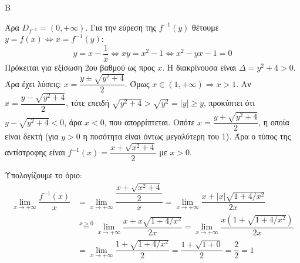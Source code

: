 \begin{thema}{Β}
\begin{erwthma}
Άρα $D_{f^{-1}} = (0, +\infty)$. Για την εύρεση της $f^{-1}(y)$ θέτουμε $y=f(x)\Leftrightarrow x=f^{-1}(y)$:
\[ y = x - \dfrac{1}{x} \Leftrightarrow xy = x^2 - 1 \Leftrightarrow x^2 - yx - 1 = 0 \]
Πρόκειται για εξίσωση 2ου βαθμού ως προς $x$. Η διακρίνουσα είναι $\Delta = y^2 + 4 > 0$. Άρα έχει λύσεις:
$x = \dfrac{y \pm \sqrt{y^2+4}}{2}$.
Όμως $x \in (1, +\infty) \Rightarrow x > 1$.
Αν $x = \dfrac{y - \sqrt{y^2+4}}{2}$, τότε επειδή $\sqrt{y^2+4} > \sqrt{y^2} = |y| \ge y$, προκύπτει ότι $y - \sqrt{y^2+4} < 0$, άρα $x < 0$, που απορρίπτεται.
Οπότε $x = \dfrac{y + \sqrt{y^2+4}}{2}$, η οποία είναι δεκτή (για $y>0$ η ποσότητα είναι όντως μεγαλύτερη του 1).
Άρα ο τύπος της αντίστροφης είναι $f^{-1}(x) = \dfrac{x + \sqrt{x^2+4}}{2}$ με $x > 0$.

\item Υπολογίζουμε το όριο:
\begin{align*}
\lim\limits_{x\to+\infty} \dfrac{f^{-1}(x)}{x} &= \lim\limits_{x\to+\infty} \dfrac{\dfrac{x + \sqrt{x^2+4}}{2}}{x} = \lim\limits_{x\to+\infty} \dfrac{x + |x|\sqrt{1+4/x^2}}{2x} \\
&\stackrel{x>0}{=} \lim\limits_{x\to+\infty} \dfrac{x + x\sqrt{1+4/x^2}}{2x} = \lim\limits_{x\to+\infty} \dfrac{x(1 + \sqrt{1+4/x^2})}{2x} \\
&= \lim\limits_{x\to+\infty} \dfrac{1 + \sqrt{1+4/x^2}}{2} = \dfrac{1 + \sqrt{1+0}}{2} = \dfrac{2}{2} = 1
\end{align*}
\end{erwthma}
\end{thema}

